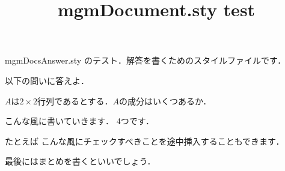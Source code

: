 \documentclass{jsarticle}
\title{mgmDocument.sty test}
\begin{document}
\maketitle

mgmDocsAnswer.sty のテスト．解答を書くためのスタイルファイルです．

\begin{questionpart}
\begin{daimon}
以下の問いに答えよ．
\begin{shomon}
\item $A$は$2\times 2$行列であるとする．$A$の成分はいくつあるか．
\end{shomon}
\end{daimon}
\end{questionpart}

\begin{multicols}{2}

\Shomon
こんな風に書いていきます．
4つです．

\setcounter{kaitou}{9}


\begin{opcheck}{たとえば}
こんな風にチェックすべきことを途中挿入することもできます．
\end{opcheck}

\begin{matome}
最後にはまとめを書くといいでしょう．
\end{matome}

\end{multicols}
\end{document}
